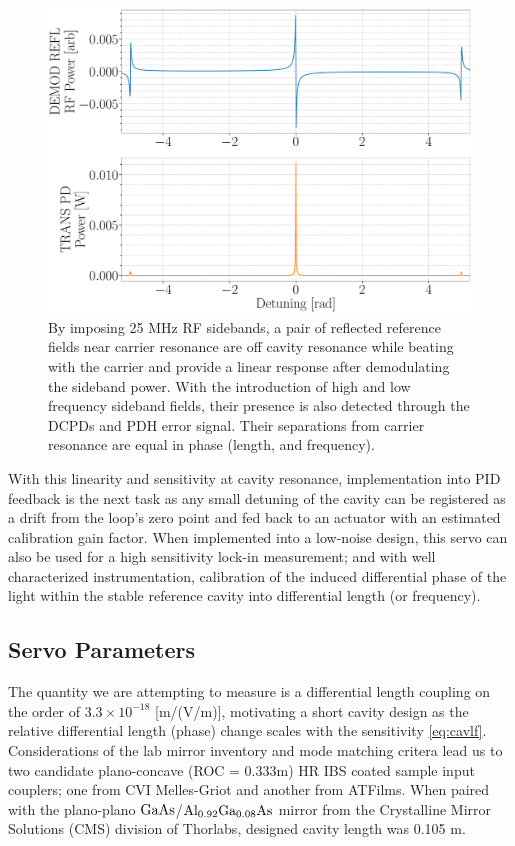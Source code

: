 \begin{figure}[H]
	\includegraphics[width=\textwidth]{figs/ALGAAS/pdh_error.pdf}
	\caption{By imposing 25 MHz RF sidebands, a pair of reflected reference fields near carrier resonance are off cavity resonance while beating with the carrier and provide a linear response after demodulating the sideband power. With the introduction of high and low frequency sideband fields, their presence is also detected through the DCPDs and PDH error signal. Their separations from carrier resonance are equal in phase (length, and frequency).~\cite{Bond:2017}}
\label{fig:pdherr}
\end{figure}

With this linearity and sensitivity at cavity resonance, implementation into PID feedback is the next task as any small detuning of the cavity can be registered as a drift from the loop's zero point and fed back to an actuator with an estimated calibration gain factor. When implemented into a low-noise design, this servo can also be used for a high sensitivity lock-in measurement; and with well characterized instrumentation, calibration of the induced differential phase of the light within the stable reference cavity into differential length (or frequency).


\subsection{Servo Parameters}
The quantity we are attempting to measure is a differential length coupling on the order of $3.3 \times 10^{-18}$ [m/(V/m)], motivating a short cavity design as the relative differential length (phase) change scales with the sensitivity \autoref{eq:cavlf}. Considerations of the lab mirror inventory and mode matching critera lead us to two candidate plano-concave (ROC = 0.333m) HR IBS coated sample input couplers; one from CVI Melles-Griot and another from ATFilms. When paired with the plano-plano $\mathrm{GaAs}$/$\mathrm{Al_{0.92}Ga_{0.08}As}$  mirror from the Crystalline Mirror Solutions (CMS) division of Thorlabs, designed cavity length was 0.105 m.

